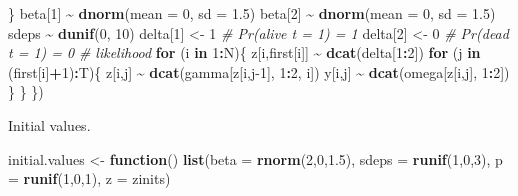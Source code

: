 \documentclass[
  12pt,
]{krantz}
\newenvironment{Shaded}{\begin{snugshade}}{\end{snugshade}}
\newcommand{\AttributeTok}[1]{\textcolor[rgb]{0.13,0.29,0.53}{#1}}
\newcommand{\CommentTok}[1]{\textcolor[rgb]{0.56,0.35,0.01}{\textit{#1}}}
\newcommand{\ControlFlowTok}[1]{\textcolor[rgb]{0.13,0.29,0.53}{\textbf{#1}}}
\newcommand{\DecValTok}[1]{\textcolor[rgb]{0.00,0.00,0.81}{#1}}
\newcommand{\FloatTok}[1]{\textcolor[rgb]{0.00,0.00,0.81}{#1}}
\newcommand{\FunctionTok}[1]{\textcolor[rgb]{0.13,0.29,0.53}{\textbf{#1}}}
\newcommand{\NormalTok}[1]{#1}
\newcommand{\OtherTok}[1]{\textcolor[rgb]{0.56,0.35,0.01}{#1}}
\newcommand{\SpecialCharTok}[1]{\textcolor[rgb]{0.81,0.36,0.00}{\textbf{#1}}}
\begin{document}
\begin{Shaded}
\begin{Highlighting}[]
\NormalTok{  \}}
\NormalTok{  beta[}\DecValTok{1}\NormalTok{] }\SpecialCharTok{\textasciitilde{}} \FunctionTok{dnorm}\NormalTok{(}\AttributeTok{mean =} \DecValTok{0}\NormalTok{, }\AttributeTok{sd =} \FloatTok{1.5}\NormalTok{)}
\NormalTok{  beta[}\DecValTok{2}\NormalTok{] }\SpecialCharTok{\textasciitilde{}} \FunctionTok{dnorm}\NormalTok{(}\AttributeTok{mean =} \DecValTok{0}\NormalTok{, }\AttributeTok{sd =} \FloatTok{1.5}\NormalTok{)}
\NormalTok{  sdeps }\SpecialCharTok{\textasciitilde{}} \FunctionTok{dunif}\NormalTok{(}\DecValTok{0}\NormalTok{, }\DecValTok{10}\NormalTok{)}
\NormalTok{  delta[}\DecValTok{1}\NormalTok{] }\OtherTok{\textless{}{-}} \DecValTok{1}          \CommentTok{\# Pr(alive t = 1) = 1}
\NormalTok{  delta[}\DecValTok{2}\NormalTok{] }\OtherTok{\textless{}{-}} \DecValTok{0}          \CommentTok{\# Pr(dead t = 1) = 0}
  \CommentTok{\# likelihood}
  \ControlFlowTok{for}\NormalTok{ (i }\ControlFlowTok{in} \DecValTok{1}\SpecialCharTok{:}\NormalTok{N)\{}
\NormalTok{    z[i,first[i]] }\SpecialCharTok{\textasciitilde{}} \FunctionTok{dcat}\NormalTok{(delta[}\DecValTok{1}\SpecialCharTok{:}\DecValTok{2}\NormalTok{])}
    \ControlFlowTok{for}\NormalTok{ (j }\ControlFlowTok{in}\NormalTok{ (first[i]}\SpecialCharTok{+}\DecValTok{1}\NormalTok{)}\SpecialCharTok{:}\NormalTok{T)\{}
\NormalTok{      z[i,j] }\SpecialCharTok{\textasciitilde{}} \FunctionTok{dcat}\NormalTok{(gamma[z[i,j}\DecValTok{{-}1}\NormalTok{], }\DecValTok{1}\SpecialCharTok{:}\DecValTok{2}\NormalTok{, i])}
\NormalTok{      y[i,j] }\SpecialCharTok{\textasciitilde{}} \FunctionTok{dcat}\NormalTok{(omega[z[i,j], }\DecValTok{1}\SpecialCharTok{:}\DecValTok{2}\NormalTok{])}
\NormalTok{    \}}
\NormalTok{  \}}
\NormalTok{\})}
\end{Highlighting}
\end{Shaded}

Initial values.

\begin{Shaded}
\begin{Highlighting}[]
\NormalTok{initial.values }\OtherTok{\textless{}{-}} \ControlFlowTok{function}\NormalTok{() }\FunctionTok{list}\NormalTok{(}\AttributeTok{beta =} \FunctionTok{rnorm}\NormalTok{(}\DecValTok{2}\NormalTok{,}\DecValTok{0}\NormalTok{,}\FloatTok{1.5}\NormalTok{),}
                                  \AttributeTok{sdeps =} \FunctionTok{runif}\NormalTok{(}\DecValTok{1}\NormalTok{,}\DecValTok{0}\NormalTok{,}\DecValTok{3}\NormalTok{),}
                                  \AttributeTok{p =} \FunctionTok{runif}\NormalTok{(}\DecValTok{1}\NormalTok{,}\DecValTok{0}\NormalTok{,}\DecValTok{1}\NormalTok{),}
                                  \AttributeTok{z =}\NormalTok{ zinits)}
\end{Highlighting}
\end{Shaded}
\end{document}
